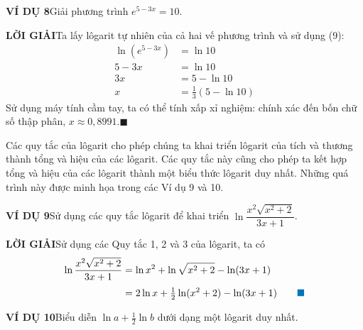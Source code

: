 \thispagestyle{fancy}
\fancyhf{}
\fancyhead[RE,RO]{}

\noindent
\begin{minipage}[t]{0.26\textwidth}
\end{minipage}%
\hfill
\begin{minipage}[t]{0.71\textwidth}
\noindent\textbf{\textsf{\color{stewartcyan}VÍ DỤ 8}}\quad Giải phương trình $e^{5-3x} = 10$.

\vspace{0.14cm}
\noindent\textbf{\textsf{\color{stewartcyan}LỜI GIẢI}}\quad Ta lấy lôgarit tự nhiên của cả hai vế phương trình và sử dụng (9):
\begin{align*}
\ln(e^{5-3x}) &= \ln 10\\[3pt]
5 - 3x &= \ln 10\\[3pt]
3x &= 5 - \ln 10\\[3pt]
x &= \tfrac{1}{3}(5 - \ln 10)
\end{align*}
Sử dụng máy tính cầm tay, ta có thể tính xấp xỉ nghiệm: chính xác đến bốn chữ số thập phân, $x \approx 0{,}8991$.\hfill{\color{stewartcyan}$\blacksquare$}

\vspace{0.28cm}
Các quy tắc của lôgarit cho phép chúng ta khai triển lôgarit của tích và thương thành tổng và hiệu của các lôgarit. Các quy tắc này cũng cho phép ta kết hợp tổng và hiệu của các lôgarit thành một biểu thức lôgarit duy nhất. Những quá trình này được minh họa trong các Ví dụ 9 và 10.

\vspace{0.25cm}
\noindent\textbf{\textsf{\color{stewartcyan}VÍ DỤ 9}}\quad Sử dụng các quy tắc lôgarit để khai triển $\ln \dfrac{x^2\sqrt{x^2 + 2}}{3x + 1}$.

\vspace{0.14cm}
\noindent\textbf{\textsf{\color{stewartcyan}LỜI GIẢI}}\quad Sử dụng các Quy tắc 1, 2 và 3 của lôgarit, ta có
\begin{align*}
\ln \frac{x^2\sqrt{x^2 + 2}}{3x + 1} &= \ln x^2 + \ln\sqrt{x^2 + 2} - \ln(3x + 1)\\[3pt]
&= 2\ln x + \tfrac{1}{2}\ln(x^2 + 2) - \ln(3x + 1)\tag*{\color{stewartcyan}$\blacksquare$}
\end{align*}

\vspace{0.16cm}
\noindent\textbf{\textsf{\color{stewartcyan}VÍ DỤ 10}}\quad Biểu diễn $\ln a + \tfrac{1}{2}\ln b$ dưới dạng một lôgarit duy nhất.


\end{minipage}
